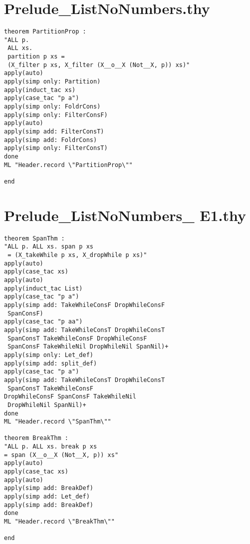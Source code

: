 \section{Prelude\_ListNoNumbers.thy}
\label{appendix:strictProofs:List}
\begin{multicols}{2}
\tiny
\begin{Verbatim}
theorem PartitionProp :
"ALL p.
 ALL xs.
 partition p xs =
 (X_filter p xs, X_filter (X__o__X (Not__X, p)) xs)"
apply(auto)
apply(simp only: Partition)
apply(induct_tac xs)
apply(case_tac "p a")
apply(simp only: FoldrCons)
apply(simp only: FilterConsF)
apply(auto)
apply(simp add: FilterConsT)
apply(simp add: FoldrCons)
apply(simp only: FilterConsT)
done
ML "Header.record \"PartitionProp\""

end
\end{Verbatim}
\end{multicols}

\section{Prelude\_ListNoNumbers\_ E1.thy}
\label{appendix:strictProofs:ListE1}
\begin{multicols}{2}
\tiny
\begin{Verbatim}
theorem SpanThm :
"ALL p. ALL xs. span p xs
 = (X_takeWhile p xs, X_dropWhile p xs)"
apply(auto)
apply(case_tac xs)
apply(auto)
apply(induct_tac List)
apply(case_tac "p a")
apply(simp add: TakeWhileConsF DropWhileConsF
 SpanConsF)
apply(case_tac "p aa")
apply(simp add: TakeWhileConsT DropWhileConsT
 SpanConsT TakeWhileConsF DropWhileConsF
 SpanConsF TakeWhileNil DropWhileNil SpanNil)+
apply(simp only: Let_def)
apply(simp add: split_def)
apply(case_tac "p a")
apply(simp add: TakeWhileConsT DropWhileConsT
 SpanConsT TakeWhileConsF
DropWhileConsF SpanConsF TakeWhileNil
 DropWhileNil SpanNil)+
done
ML "Header.record \"SpanThm\""

theorem BreakThm :
"ALL p. ALL xs. break p xs 
= span (X__o__X (Not__X, p)) xs"
apply(auto)
apply(case_tac xs)
apply(auto)
apply(simp add: BreakDef)
apply(simp add: Let_def)
apply(simp add: BreakDef)
done
ML "Header.record \"BreakThm\""

end
\end{Verbatim}
\end{multicols}

